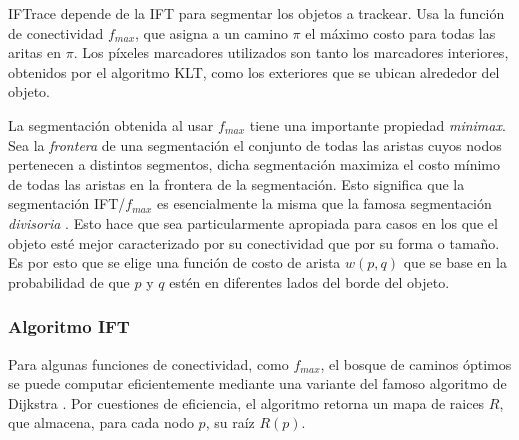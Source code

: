 \documentclass[a4paper,10pt]{article}
\begin{document}
IFTrace depende de la IFT
para segmentar los objetos a trackear. Usa la función de conectividad $f_{max}$, que
asigna a un camino $\pi$ el máximo costo para todas las aritas en $\pi$.
Los píxeles marcadores utilizados son tanto los marcadores interiores, obtenidos
por el algoritmo KLT, como los exteriores que se ubican alrededor del objeto.

La segmentación obtenida al usar $f_{max}$ tiene una importante propiedad 
\textit{minimax}. Sea la \textit{frontera} de una segmentación el conjunto de todas las aristas cuyos nodos
pertenecen a distintos segmentos, dicha segmentación maximiza el costo mínimo de todas las aristas en la frontera de la 
segmentación. Esto significa que la segmentación IFT/$f_{max}$ es esencialmente
la misma que la famosa segmentación \textit{divisoria} \cite{watershed-segmentation}. Esto 
hace que sea particularmente apropiada para casos en los que el objeto esté 
mejor caracterizado por su conectividad que por su forma o tamaño. Es por esto que 
se elige una función de costo de arista $w(p,q)$ que se base en la probabilidad de 
que $p$ y $q$ estén en diferentes lados del borde del objeto.

\subsubsection{Algoritmo IFT}

Para algunas funciones de conectividad, como $f_{max}$, el bosque de caminos
óptimos se puede computar eficientemente mediante una variante del famoso 
algoritmo de Dijkstra \cite{watershed-segmentation}. Por cuestiones de
eficiencia, el algoritmo retorna un mapa de raices $R$, que almacena, para 
cada nodo $p$, su raíz $R(p)$.\\
\end{document}
